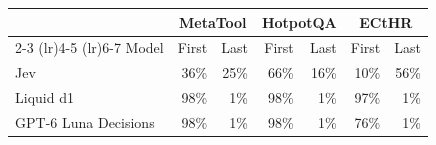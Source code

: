 \begin{tabular}{lrrrrrr}
\toprule
 & \multicolumn{2}{c}{MetaTool} & \multicolumn{2}{c}{HotpotQA} & \multicolumn{2}{c}{ECtHR} \\
\cmidrule(lr){2-3} \cmidrule(lr){4-5} \cmidrule(lr){6-7}
Model & First & Last & First & Last & First & Last \\
\midrule
Jev & 36\% & 25\% & 66\% & 16\% & 10\% & 56\% \\
Liquid d1 & 98\% & 1\% & 98\% & 1\% & 97\% & 1\% \\
GPT-6 Luna Decisions & 98\% & 1\% & 98\% & 1\% & 76\% & 1\% \\
\bottomrule
\end{tabular}
